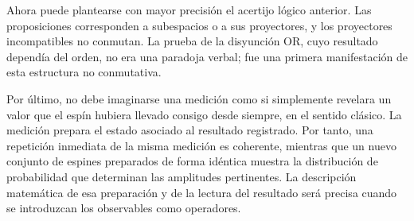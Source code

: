Ahora puede plantearse con mayor precisión el acertijo lógico anterior. Las proposiciones corresponden a subespacios o a sus proyectores, y los proyectores incompatibles no conmutan. La prueba de la disyunción OR, cuyo resultado dependía del orden, no era una paradoja verbal; fue una primera manifestación de esta estructura no conmutativa.

\begin{classroomqa}
\end{classroomqa}

\begin{classroomqa}
\end{classroomqa}

Por último, no debe imaginarse una medición como si simplemente revelara un valor que el espín hubiera llevado consigo desde siempre, en el sentido clásico. La medición prepara el estado asociado al resultado registrado. Por tanto, una repetición inmediata de la misma medición es coherente, mientras que un nuevo conjunto de espines preparados de forma idéntica muestra la distribución de probabilidad que determinan las amplitudes pertinentes. La descripción matemática de esa preparación y de la lectura del resultado será precisa cuando se introduzcan los observables como operadores.